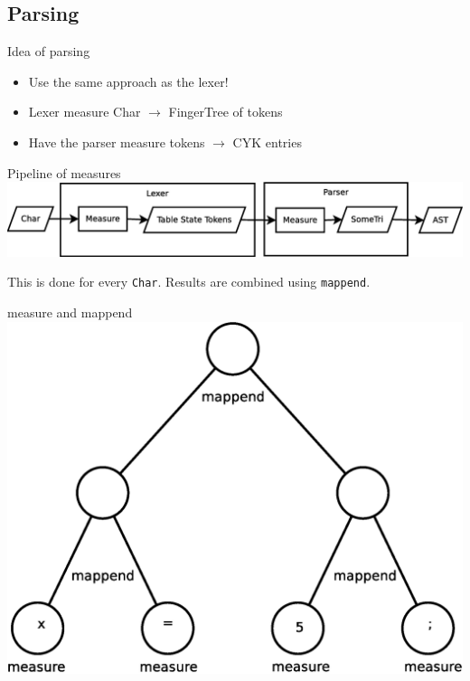 \documentclass{beamer}
\begin{document}
\subsection{Parsing}
\begin{frame}{Idea of parsing}
    \begin{itemize}
        \item Use the same approach as the lexer!
        \item Lexer measure Char $\rightarrow$ FingerTree of tokens
        \item Have the parser measure tokens $\rightarrow$ CYK entries
    \end{itemize}
\end{frame}

\begin{frame}{Pipeline of measures}
\includegraphics[width=\textwidth]{pipeline.eps}

This is done for every \texttt{Char}. Results are combined using
\texttt{mappend}.
\end{frame}

\begin{frame}{measure and mappend}
    \centering
    \includegraphics[width=.8\textwidth]{tree.eps}
\end{frame}

\end{document}

